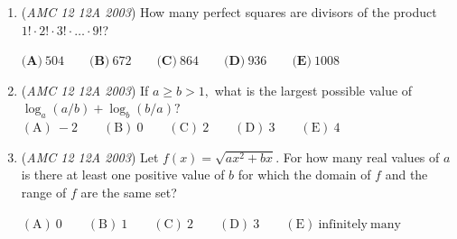\begin{enumerate}
	\item (\textit{AMC 12 12A 2003}) How many perfect squares are divisors of the product $1! \cdot 2! \cdot 3! \cdot \hdots \cdot 9!$?


 $\textbf{(A)}\ 504\qquad\textbf{(B)}\ 672\qquad\textbf{(C)}\ 864\qquad\textbf{(D)}\ 936\qquad\textbf{(E)}\ 1008$


	\item (\textit{AMC 12 12A 2003}) If $a\geq b > 1,$ what is the largest possible value of $\log_{a}(a/b) + \log_{b}(b/a)?$
$\mathrm{(A)}\ -2      \qquad \mathrm{(B)}\ 0     \qquad \mathrm{(C)}\ 2      \qquad \mathrm{(D)}\ 3      \qquad \mathrm{(E)}\ 4$


	\item (\textit{AMC 12 12A 2003}) Let $f(x)= \sqrt{ax^2+bx}$.  For how many real values of $a$ is there at least one positive value of $b$ for which the domain of $f$ and the range of $f$ are the same set?


 $\mathrm{(A) \ 0 } \qquad \mathrm{(B) \ 1 } \qquad \mathrm{(C) \ 2 } \qquad \mathrm{(D) \ 3 } \qquad \mathrm{(E) \ \mathrm{infinitely \ many} }$


\end{enumerate}